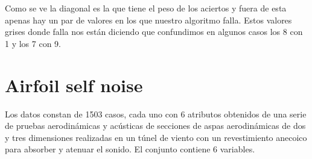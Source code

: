 \documentclass[titlepage]{article}
\begin{document}
Como se ve la diagonal es la que tiene el peso de los aciertos y fuera de esta apenas hay un par de valores en los que nuestro algoritmo falla. Estos valores grises donde falla nos están diciendo que confundimos en algunos casos los 8 con 1 y los 7 con 9. 



\section{Airfoil self noise}
Los datos constan de 1503 casos, cada uno con 6 atributos obtenidos de una serie de pruebas aerodinámicas y acústicas de secciones de aspas aerodinámicas de dos y tres dimensiones realizadas en un túnel de viento con un revestimiento anecoico para absorber y atenuar el sonido. El conjunto contiene 6 variables. 
\end{document}
